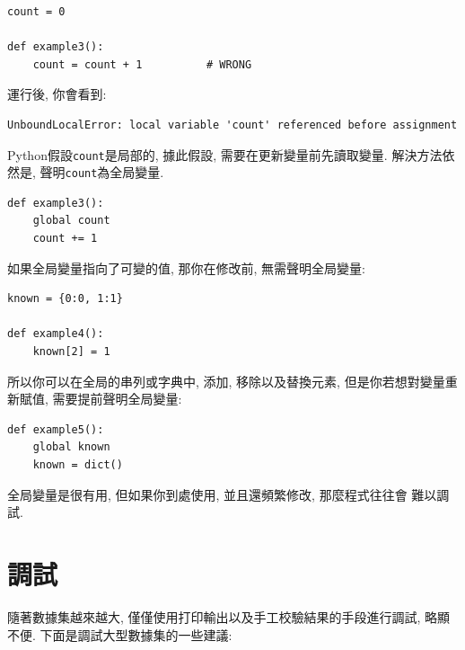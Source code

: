 \documentclass[10pt]{book}
\begin{document}
\begin{verbatim}
count = 0

def example3():
    count = count + 1          # WRONG
\end{verbatim}
%
運行後, 你會看到:

\begin{verbatim}
UnboundLocalError: local variable 'count' referenced before assignment
\end{verbatim}
%
Python假設{\tt count}是局部的, 據此假設, 需要在更新變量前先讀取變量. 
解決方法依然是, 聲明{\tt count}為全局變量. 

\begin{verbatim}
def example3():
    global count
    count += 1
\end{verbatim}
%
如果全局變量指向了可變的值, 那你在修改前, 無需聲明全局變量:

\begin{verbatim}
known = {0:0, 1:1}

def example4():
    known[2] = 1
\end{verbatim}
%
所以你可以在全局的串列或字典中, 添加, 移除以及替換元素, 
但是你若想對變量重新賦值, 需要提前聲明全局變量:

\begin{verbatim}
def example5():
    global known
    known = dict()
\end{verbatim}
%
全局變量是很有用, 但如果你到處使用, 並且還頻繁修改, 那麼程式往往會
難以調試. 


\section{調試}
隨著數據集越來越大, 僅僅使用打印輸出以及手工校驗結果的手段進行調試, 略顯不便. 
下面是調試大型數據集的一些建議:
\end{document}
